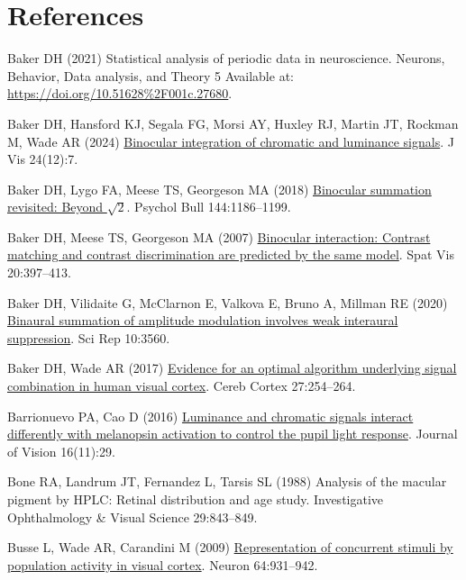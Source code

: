 \documentclass[
]{article}
\newlength{\cslhangindent}
\newenvironment{CSLReferences}[2] %
 {\begin{list}{}{%
  \setlength{\itemindent}{0pt}
  \setlength{\leftmargin}{0pt}
  \setlength{\parsep}{0pt}
  \ifodd #1
   \setlength{\leftmargin}{\cslhangindent}
   \setlength{\itemindent}{-1\cslhangindent}
  \fi
  \setlength{\itemsep}{#2\baselineskip}}}
 {\end{list}}
\begin{document}
\section{References}\label{references}

\label{refs}
\begin{CSLReferences}{1}{1}
Baker DH (2021) Statistical analysis of periodic data in neuroscience. Neurons, Behavior, Data analysis, and Theory 5 Available at: \url{https://doi.org/10.51628\%2F001c.27680}.

Baker DH, Hansford KJ, Segala FG, Morsi AY, Huxley RJ, Martin JT, Rockman M, Wade AR (2024) \href{https://doi.org/10.1167/jov.24.12.7}{Binocular integration of chromatic and luminance signals}. J Vis 24(12):7.

Baker DH, Lygo FA, Meese TS, Georgeson MA (2018) \href{https://doi.org/10.1037/bul0000163}{Binocular summation revisited: Beyond \(\sqrt{2}\)}. Psychol Bull 144:1186--1199.

Baker DH, Meese TS, Georgeson MA (2007) \href{https://doi.org/10.1163/156856807781503622}{Binocular interaction: Contrast matching and contrast discrimination are predicted by the same model}. Spat Vis 20:397--413.

Baker DH, Vilidaite G, McClarnon E, Valkova E, Bruno A, Millman RE (2020) \href{https://doi.org/10.1038/s41598-020-60602-5}{Binaural summation of amplitude modulation involves weak interaural suppression}. Sci Rep 10:3560.

Baker DH, Wade AR (2017) \href{https://doi.org/10.1093/cercor/bhw395}{Evidence for an optimal algorithm underlying signal combination in human visual cortex}. Cereb Cortex 27:254--264.

Barrionuevo PA, Cao D (2016) \href{https://doi.org/10.1167/16.11.29}{Luminance and chromatic signals interact differently with melanopsin activation to control the pupil light response}. Journal of Vision 16(11):29.

Bone RA, Landrum JT, Fernandez L, Tarsis SL (1988) Analysis of the macular pigment by {HPLC}: Retinal distribution and age study. Investigative Ophthalmology \& Visual Science 29:843--849.

Busse L, Wade AR, Carandini M (2009) \href{https://doi.org/10.1016/j.neuron.2009.11.004}{Representation of concurrent stimuli by population activity in visual cortex}. Neuron 64:931--942.


\end{CSLReferences}
\end{document}

